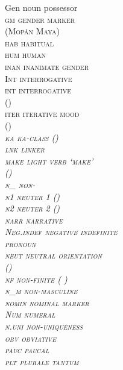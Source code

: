 \documentclass[output=collectionpaper]{langsci/langscibook}
\begin{document}
\begin{multicols}{2}
\begin{tabbing}
\normalfont Gen	\>	noun possessor	\\
\scshape gm	\>	gender marker\\ \> (Mopán Maya)	\\
\scshape hab	\>	habitual	\\
\scshape hum	\>	human	\\
\scshape inan	\>	inanimate gender	\\
Int	\>	interrogative	\\
\scshape int	\>	interrogative \\ \> ()	\\
\scshape iter	\>	iterative mood \\ \> ()	\\
\scshape \itshape ka	\>	\textit{ka}-class ()	\\
\scshape lnk	\>	linker	\\
\scshape make	\>	light verb `make'\\ \> ()	\\
\scshape n\_	\>	non-	\\
\scshape n1	\>	neuter 1 ()	\\
\scshape n2	\>	neuter 2 ()	\\
\scshape narr	\>	narrative	\\
\normalfont Neg.indef	\>	negative indefinite\\ \> pronoun	\\
\scshape neut	\>	neutral orientation\\ \> () 	\\
\scshape nf	\>	non-finite ( )	\\
\scshape n\_m	\>	non-masculine	\\
\scshape nomin	\>	nominal marker	\\
\normalfont Num	\>	numeral	\\
\scshape n.uni	\>	non-uniqueness	\\
\scshape obv	\>	obviative	\\
\scshape pauc	\>	paucal	\\
\scshape plt	\>	plurale tantum	\\

\end{tabbing}
\end{multicols}
\end{document}
